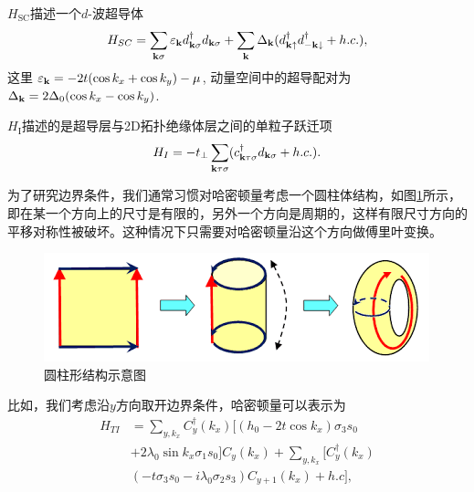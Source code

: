  $H_\mathrm{SC}$描述一个$d$-波超导体
\begin{equation}
H_{SC}=\sum_{{\bf k}\sigma}\varepsilon_{\bf k}d^\dagger_{{\bf k}\sigma}d_{{\bf k}\sigma}+\sum_{{\bf k}}\Delta_{\bf k}(d^\dagger_{{\bf k}\uparrow}d^\dagger_{{-\bf k}\downarrow}+h.c.),
\end{equation}
这里 $\varepsilon_{\bf k}=-2t(\cos k_x+\cos k_y)-\mu$, 动量空间中的超导配对为 $\Delta_{\bf k}=2\Delta_0 (\cos k_x-\cos k_y)$.

\qquad $H_\mathrm{I}$描述的是超导层与2D拓扑绝缘体层之间的单粒子跃迁项
\begin{equation}
H_{I}=-t_\perp \sum_{{\bf k}\tau\sigma}(c_{{\bf k}\tau\sigma}^\dagger d_{{\bf k}\sigma}+h.c.).
\end{equation}

 为了研究边界条件，我们通常习惯对哈密顿量考虑一个圆柱体结构，如图\ref{fig15}所示，即在某一个方向上的尺寸是有限的，另外一个方向是周期的，这样有限尺寸方向的平移对称性被破坏。这种情况下只需要对哈密顿量沿这个方向做傅里叶变换。
\begin{figure}
\centering
\includegraphics[scale=0.6]{pic/fig16}
\caption{圆柱形结构示意图}\label{fig15}
\end{figure}


 比如，我们考虑沿$y$方向取开边界条件，哈密顿量可以表示为
\begin{equation}
	\begin{aligned}
		H_{TI} &= \sum_{y,k_x}C^\dagger_{y}(k_x)[(h_0-2t\cos k_x)\sigma_3s_0 \\&+2\lambda_0\sin k_x\sigma_1s_0]C_{y}(k_x)
		+\sum_{y,k_x}[C^\dagger_{y}(k_x)\\&(-t\sigma_3s_0-i\lambda_0\sigma_2s_3)C_{y+1}(k_x)+h.c],
	\end{aligned}
\end{equation}

